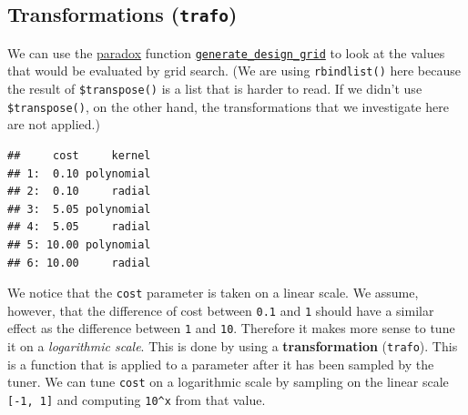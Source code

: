 \documentclass[
]{scrbook}
\newenvironment{Shaded}{\begin{snugshade}}{\end{snugshade}}
\newcommand{\AttributeTok}[1]{\textcolor[rgb]{0.77,0.63,0.00}{#1}}
\newcommand{\ControlFlowTok}[1]{\textcolor[rgb]{0.13,0.29,0.53}{\textbf{#1}}}
\newcommand{\DecValTok}[1]{\textcolor[rgb]{0.00,0.00,0.81}{#1}}
\newcommand{\FunctionTok}[1]{\textcolor[rgb]{0.00,0.00,0.00}{#1}}
\newcommand{\NormalTok}[1]{#1}
\newcommand{\OtherTok}[1]{\textcolor[rgb]{0.56,0.35,0.01}{#1}}
\newcommand{\SpecialCharTok}[1]{\textcolor[rgb]{0.00,0.00,0.00}{#1}}
\newcommand{\StringTok}[1]{\textcolor[rgb]{0.31,0.60,0.02}{#1}}
\renewenvironment{Shaded} {\begin{snugshade}\small} {\end{snugshade}}
\begin{document}
\hypertarget{searchspace-trafo}{%
\subsection{\texorpdfstring{Transformations (\texttt{trafo})}{Transformations (trafo)}}\label{searchspace-trafo}}

We can use the \href{https://paradox.mlr-org.com}{paradox} function \href{https://paradox.mlr-org.com/reference/generate_design_grid.html}{\texttt{generate\_design\_grid}} to look at the values that would be evaluated by grid search.
(We are using \texttt{rbindlist()} here because the result of \texttt{\$transpose()} is a list that is harder to read. If we didn't use \texttt{\$transpose()}, on the other hand, the transformations that we investigate here are not applied.)

\begin{Shaded}
\end{Shaded}

\begin{verbatim}
##     cost     kernel
## 1:  0.10 polynomial
## 2:  0.10     radial
## 3:  5.05 polynomial
## 4:  5.05     radial
## 5: 10.00 polynomial
## 6: 10.00     radial
\end{verbatim}

We notice that the \texttt{cost} parameter is taken on a linear scale.
We assume, however, that the difference of cost between \texttt{0.1} and \texttt{1} should have a similar effect as the difference between \texttt{1} and \texttt{10}.
Therefore it makes more sense to tune it on a \emph{logarithmic scale}.
This is done by using a \textbf{transformation} (\texttt{trafo}).
This is a function that is applied to a parameter after it has been sampled by the tuner.
We can tune \texttt{cost} on a logarithmic scale by sampling on the linear scale \texttt{{[}-1,\ 1{]}} and computing \texttt{10\^{}x} from that value.

\begin{Shaded}
\end{Shaded}
\end{document}
